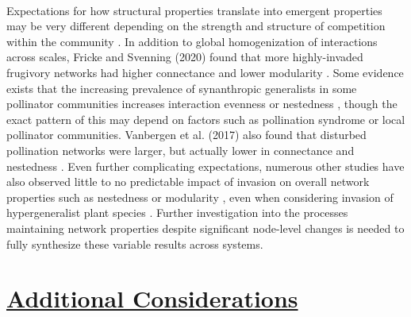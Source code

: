     \paragraph{}
    Expectations for how structural properties translate into emergent properties may be very different depending on the strength and structure of competition within the community \parencite{pascual2017mutualism, wang2023interspecific}. In addition to global homogenization of interactions across scales, Fricke and Svenning (2020) found that more highly-invaded frugivory networks had higher connectance and lower modularity \parencite{fricke2020accelerating}. Some evidence exists that the increasing prevalence of synanthropic generalists in some pollinator communities increases interaction evenness \parencite{schneiberg2020urbanization} or nestedness \parencite{bartomeus2008contrasting}, though the exact pattern of this may depend on factors such as pollination syndrome or local pollinator communities. Vanbergen et al. (2017) also found that disturbed pollination networks were larger, but actually lower in connectance and nestedness \parencite{vanbergen2017network}. Even further complicating expectations, numerous other studies have also observed little to no predictable impact of invasion on overall network properties such as nestedness or modularity \parencite{stouffer2014exotic, parra2021impacts}, even when considering invasion of hypergeneralist plant species \parencite{vila2009invasive}. Further investigation into the processes maintaining network properties despite significant node-level changes is needed to fully synthesize these variable results across systems. 

\section*{\textbf{\underline{Additional Considerations}}}
